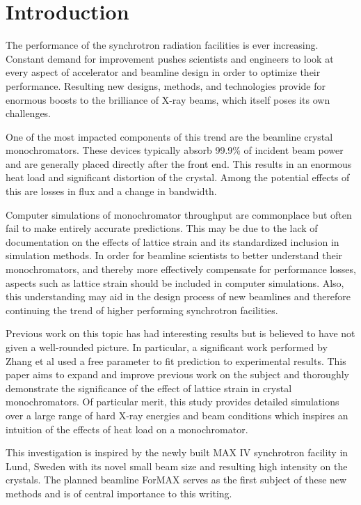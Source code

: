 \documentclass[preprint]{iucr}              %
\begin{document}
\section{Introduction}

The performance of the synchrotron radiation facilities is ever increasing. Constant demand for improvement pushes scientists and engineers to look at every aspect of accelerator and beamline design in order to optimize their performance. Resulting new designs, methods, and technologies provide for enormous boosts to the brilliance of X-ray beams, which itself poses its own challenges.

One of the most impacted components of this trend are the beamline crystal monochromators. These devices typically absorb 99.9\% of incident beam power \cite{willmott} and are generally placed directly after the front end. This results in an enormous heat load and significant distortion of the crystal. Among the potential effects of this are losses in flux and a change in bandwidth.

Computer simulations of monochromator throughput are commonplace but often fail to make entirely accurate predictions. This may be due to the lack of documentation on the effects of lattice strain and its standardized inclusion in simulation methods. In order for beamline scientists to better understand their monochromators, and thereby more effectively compensate for performance losses, aspects such as lattice strain should be included in computer simulations. Also, this understanding may aid in the design process of new beamlines and therefore continuing the trend of higher performing synchrotron facilities.

Previous work on this topic has had interesting results but is believed to have not given a well-rounded picture. In particular, a significant work performed by Zhang et al \cite{Zhang} used a free parameter to fit prediction to experimental results. This paper aims to expand and improve previous work on the subject and thoroughly demonstrate the significance of the effect of lattice strain in crystal monochromators. Of particular merit, this study provides detailed simulations over a large range of hard X-ray energies and beam conditions which inspires an intuition of the effects of heat load on a monochromator.

This investigation is inspired by the newly built MAX IV synchrotron facility in Lund, Sweden with its novel small beam size and resulting high intensity on the crystals. The planned beamline ForMAX \cite{formax} serves as the first subject of these new methods and is of central importance to this writing.
\end{document}
